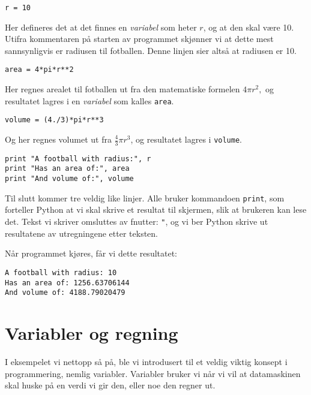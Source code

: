 \documentclass[a4paper, 11pt, notitlepage, english]{article}
\begin{document}
\vspace{0.4cm}
\begin{lstlisting}
r = 10
\end{lstlisting}
\vspace{-0.3cm}
Her defineres det at det finnes en \emph{variabel} som heter $r$, og at den skal være 10. Utifra kommentaren på starten av programmet skjønner vi at dette mest sannsynligvis er radiusen til fotballen. Denne linjen sier altså at radiusen er 10.

\vspace{0.4cm}
\begin{lstlisting}
area = 4*pi*r**2
\end{lstlisting}
\vspace{-0.3cm}
Her regnes arealet til fotballen ut fra den matematiske formelen $4\pi r^2,$
og resultatet lagres i en \emph{variabel} som kalles \verb+area+.

\vspace{0.4cm}
\begin{lstlisting}
volume = (4./3)*pi*r**3
\end{lstlisting}
\vspace{-0.3cm}
Og her regnes volumet ut fra $\frac{4}{3}\pi r^3$, og resultatet lagres i \verb+volume+.

\vspace{0.4cm}
\begin{lstlisting}
print "A football with radius:", r
print "Has an area of:", area 
print "And volume of:", volume
\end{lstlisting}
\vspace{-0.3cm}
Til slutt kommer tre veldig like linjer. Alle bruker kommandoen \verb+print+, som forteller Python at vi skal skrive et resultat til skjermen, slik at brukeren kan lese det. Tekst vi skriver omsluttes av fnutter: \verb+"+, og vi ber Python skrive ut resultatene av utregningene etter teksten.

Når programmet kjøres, får vi dette resultatet:
\begin{lstlisting}
A football with radius: 10
Has an area of: 1256.63706144
And volume of: 4188.79020479
\end{lstlisting}

\section*{Variabler og regning}
I eksempelet vi nettopp så på, ble vi introdusert til et veldig viktig konsept i programmering, nemlig variabler. Variabler bruker vi når vi vil at datamaskinen skal huske på en verdi vi gir den, eller noe den regner ut.
\end{document}
